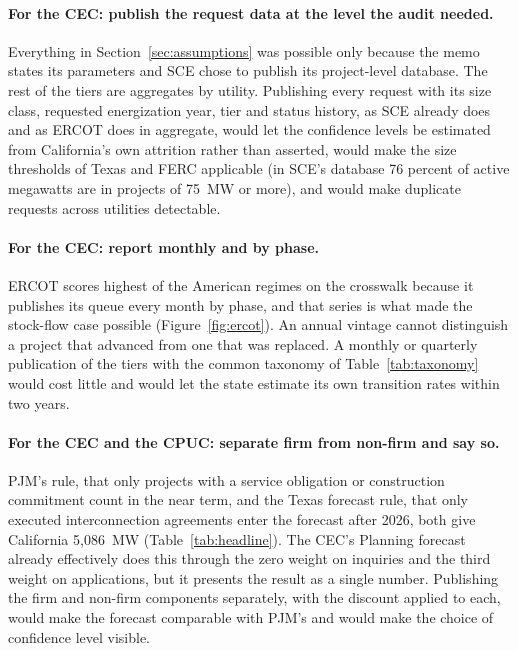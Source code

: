 \paragraph{For the CEC: publish the request data at the level the audit needed.} Everything in Section~\ref{sec:assumptions} was possible only because the memo states its parameters and SCE chose to publish its project-level database. The rest of the tiers are aggregates by utility. Publishing every request with its size class, requested energization year, tier and status history, as SCE already does and as ERCOT does in aggregate, would let the confidence levels be estimated from California's own attrition rather than asserted, would make the size thresholds of Texas and FERC applicable (in SCE's database 76 percent of active megawatts are in projects of 75~MW or more), and would make duplicate requests across utilities detectable.

\paragraph{For the CEC: report monthly and by phase.} ERCOT scores highest of the American regimes on the crosswalk because it publishes its queue every month by phase, and that series is what made the stock-flow case possible (Figure~\ref{fig:ercot}). An annual vintage cannot distinguish a project that advanced from one that was replaced. A monthly or quarterly publication of the tiers with the common taxonomy of Table~\ref{tab:taxonomy} would cost little and would let the state estimate its own transition rates within two years.

\paragraph{For the CEC and the CPUC: separate firm from non-firm and say so.} PJM's rule, that only projects with a service obligation or construction commitment count in the near term, and the Texas forecast rule, that only executed interconnection agreements enter the forecast after 2026, both give California 5,086~MW (Table~\ref{tab:headline}). The CEC's Planning forecast already effectively does this through the zero weight on inquiries and the third weight on applications, but it presents the result as a single number. Publishing the firm and non-firm components separately, with the discount applied to each, would make the forecast comparable with PJM's and would make the choice of confidence level visible.

